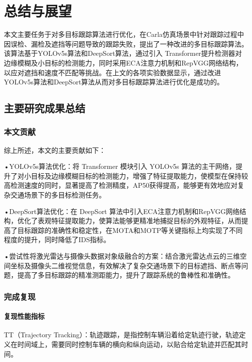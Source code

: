\chapter{总结与展望}

本文主要任务于对多目标跟踪算法进行优化，在Carla仿真场景中针对跟踪过程中因误检、漏检及遮挡等问题导致的跟踪失败，提出了一种改进的多目标跟踪算法。该算法基于YOLOv5s算法和DeepSort算法，通过引入 Transformer提升检测器对边缘模糊及小目标的检测能力，同时采用ECA注意力机制和RepVGG网络结构，以应对遮挡和速度不匹配等挑战。在上文的各项实验数据显示，通过改进YOLOv5s算法和DeepSort算法从而对多目标跟踪算法进行优化是成功的。




\section{主要研究成果总结}

\subsection{本文贡献}
综上所述，本文的主要贡献如下：

•YOLOv5s算法优化：将 Transformer 模块引入 YOLOv5s 算法的主干网络，提升了对小目标及边缘模糊目标的检测能力，增强了特征提取能力，使模型在保持较高检测速度的同时，显著提高了检测精度，AP50获得提高，能够更有效地应对复杂交通场景下的多目标检测任务。

•DeepSort算法优化：在 DeepSort 算法中引入ECA注意力机制和RepVGG网络结构，优化了表观特征提取能力，使算法能够更精准地捕捉目标的外观特征，从而提高了目标跟踪的准确性和稳定性，在MOTA和MOTP等关键指标上均实现了不同程度的提升，同时降低了IDS指标。

•尝试性将激光雷达与摄像头数据对象级融合的方案：结合激光雷达点云的三维空间坐标及摄像头二维视觉信息，有效解决了复杂交通场景下的目标遮挡、断点等问题，提高了多目标跟踪的精准测距能力，提升了跟踪系统的鲁棒性和准确性。


\subsection{完成复现}



\subsubsection{复现性能指标}
TT（Trajectory Tracking）：轨迹跟踪，是指控制车辆沿着给定轨迹行驶，轨迹定义在时间域上，需要同时控制车辆的横向和纵向运动，以贴合给定轨迹并匹配其时间。

